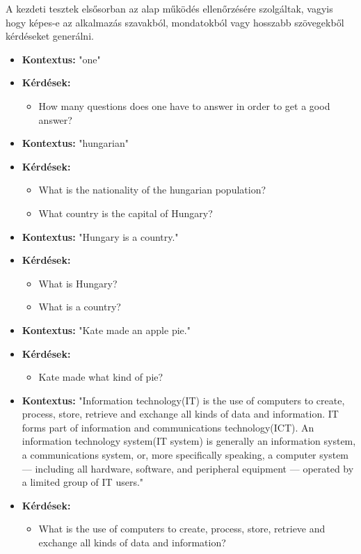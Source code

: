 \pagebreak

A kezdeti tesztek elsősorban az alap működés ellenőrzésére szolgáltak, vagyis hogy képes-e az alkalmazás szavakból, mondatokból vagy hosszabb szövegekből kérdéseket generálni.

\begin{itemize}
\item \textbf{Kontextus:} "one"
\item \textbf{Kérdések:} 
	\begin{itemize}
		\item How many questions does one have to answer in order to get a good answer?
	\end{itemize}
\item \textbf{Kontextus:} "hungarian"
\item \textbf{Kérdések: }
	\begin{itemize}
		\item What is the nationality of the hungarian population?
		\item What country is the capital of Hungary?
	\end{itemize}
\item \textbf{Kontextus:} "Hungary is a country."
\item \textbf{Kérdések:}
	\begin{itemize}
		\item What is Hungary?
		\item What is a country?
	\end{itemize}
\item \textbf{Kontextus:} "Kate made an apple pie."
\item \textbf{Kérdések:}
	\begin{itemize}
		\item Kate made what kind of pie?
	\end{itemize}
\item \textbf{Kontextus:} "Information technology(IT) is the use of computers to create, process, store, retrieve and exchange all kinds of data and information. IT forms part of information and communications technology(ICT). An information technology system(IT system) is generally an information system, a communications system, or, more specifically speaking, a computer system — including all hardware, software, and peripheral equipment — operated by a limited group of IT users."
\item \textbf{Kérdések:}
	\begin{itemize}
		\item What is the use of computers to create, process, store, retrieve and exchange all kinds of data and information?

\end{itemize}
\end{itemize}
